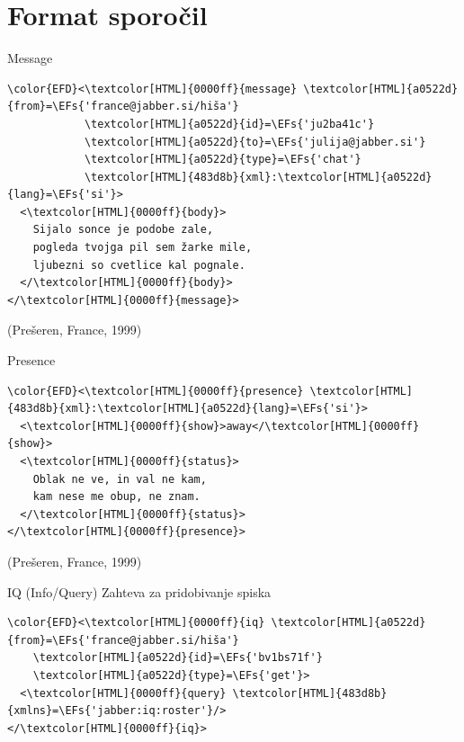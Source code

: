\documentclass[presentation]{beamer}
\newcommand{\EFs}[1]{\textcolor{EFs}{#1}} %
\begin{document}
\section{Format sporočil}
\label{sec:orgd9dd79c}

\begin{frame}[label={sec:org3d6907c},fragile]{Message}
 \begin{Code}
\begin{Verbatim}
\color{EFD}<\textcolor[HTML]{0000ff}{message} \textcolor[HTML]{a0522d}{from}=\EFs{'france@jabber.si/hiša'}
            \textcolor[HTML]{a0522d}{id}=\EFs{'ju2ba41c'}
            \textcolor[HTML]{a0522d}{to}=\EFs{'julija@jabber.si'}
            \textcolor[HTML]{a0522d}{type}=\EFs{'chat'}
            \textcolor[HTML]{483d8b}{xml}:\textcolor[HTML]{a0522d}{lang}=\EFs{'si'}>
  <\textcolor[HTML]{0000ff}{body}>
    Sijalo sonce je podobe zale,
    pogleda tvojga pil sem žarke mile,
    ljubezni so cvetlice kal pognale.
  </\textcolor[HTML]{0000ff}{body}>
</\textcolor[HTML]{0000ff}{message}>
\end{Verbatim}
\end{Code}

(Prešeren, France, 1999)
\end{frame}

\begin{frame}[label={sec:org6b47b4c},fragile]{Presence}
 \begin{Code}
\begin{Verbatim}
\color{EFD}<\textcolor[HTML]{0000ff}{presence} \textcolor[HTML]{483d8b}{xml}:\textcolor[HTML]{a0522d}{lang}=\EFs{'si'}>
  <\textcolor[HTML]{0000ff}{show}>away</\textcolor[HTML]{0000ff}{show}>
  <\textcolor[HTML]{0000ff}{status}>
    Oblak ne ve, in val ne kam,
    kam nese me obup, ne znam.
  </\textcolor[HTML]{0000ff}{status}>
</\textcolor[HTML]{0000ff}{presence}>
\end{Verbatim}
\end{Code}

(Prešeren, France, 1999)
\end{frame}

\begin{frame}[label={sec:org201c812},fragile]{IQ (Info/Query)}
 Zahteva za pridobivanje spiska

\begin{Code}
\begin{Verbatim}
\color{EFD}<\textcolor[HTML]{0000ff}{iq} \textcolor[HTML]{a0522d}{from}=\EFs{'france@jabber.si/hiša'}
    \textcolor[HTML]{a0522d}{id}=\EFs{'bv1bs71f'}
    \textcolor[HTML]{a0522d}{type}=\EFs{'get'}>
  <\textcolor[HTML]{0000ff}{query} \textcolor[HTML]{483d8b}{xmlns}=\EFs{'jabber:iq:roster'}/>
</\textcolor[HTML]{0000ff}{iq}>
\end{Verbatim}
\end{Code}
\end{frame}
\end{document}
